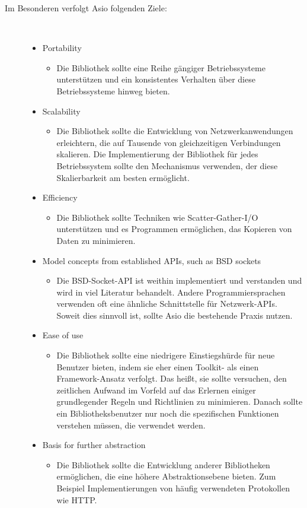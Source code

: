 \documentclass[a4paper,12pt]{article}
\begin{document}
\begin{description}
    \item[Im Besonderen verfolgt Asio folgenden Ziele:] ~\par
    \begin{itemize}
        \item Portability
        \begin{itemize}
            \item{Die Bibliothek sollte eine Reihe gängiger Betriebssysteme unterstützen und ein konsistentes Verhalten über diese Betriebssysteme hinweg bieten.}
        \end{itemize}
        \item Scalability
        \begin{itemize}
            \item{Die Bibliothek sollte die Entwicklung von Netzwerkanwendungen erleichtern, die auf Tausende von gleichzeitigen Verbindungen skalieren. Die Implementierung der Bibliothek für jedes Betriebssystem sollte den Mechanismus verwenden, der diese Skalierbarkeit am besten ermöglicht.}
        \end{itemize}
        \item Efficiency
        \begin{itemize}
            \item{Die Bibliothek sollte Techniken wie Scatter-Gather-I/O unterstützen und es Programmen ermöglichen, das Kopieren von Daten zu minimieren.}
        \end{itemize}
        \item Model concepts from established APIs, such as BSD sockets
        \begin{itemize}
            \item{Die BSD-Socket-API ist weithin implementiert und verstanden und wird in viel Literatur behandelt. Andere Programmiersprachen verwenden oft eine ähnliche Schnittstelle für Netzwerk-APIs. Soweit dies sinnvoll ist, sollte Asio die bestehende Praxis nutzen.}
        \end{itemize}
        \item Ease of use
        \begin{itemize}
            \item{Die Bibliothek sollte eine niedrigere Einstiegshürde für neue Benutzer bieten, indem sie eher einen Toolkit- als einen Framework-Ansatz verfolgt. Das heißt, sie sollte versuchen, den zeitlichen Aufwand im Vorfeld auf das Erlernen einiger grundlegender Regeln und Richtlinien zu minimieren. Danach sollte ein Bibliotheksbenutzer nur noch die spezifischen Funktionen verstehen müssen, die verwendet werden.}
        \end{itemize}
        \item Basis for further abstraction
        \begin{itemize}
            \item{Die Bibliothek sollte die Entwicklung anderer Bibliotheken ermöglichen, die eine höhere Abstraktionsebene bieten. Zum Beispiel Implementierungen von häufig verwendeten Protokollen wie HTTP.}
        \end{itemize}

    \end{itemize} 
\end{description}
\end{document}
